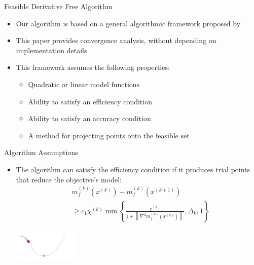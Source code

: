 \documentclass{beamer}
\newcommand{\xk}{{{x}^{(k)}}}
\begin{document}
\begin{frame}{Feasible Derivative Free Algorithm}
	\begin{itemize}
		\item Our algorithm is based on a general algorithmic framework proposed by \cite{CONEJO2013324}
		\item This paper provides convergence analysis, without depending on implementation details
		\item This framework assumes the following properties:
			\begin{itemize}
				\item Quadratic or linear model functions
				\item Ability to satisfy an efficiency condition
				\item Ability to satisfy an accuracy condition
				\item A method for projecting points onto the feasible set
			\end{itemize}
	\end{itemize}
\end{frame}




\begin{frame}{Algorithm Assumptions}
	\begin{itemize}
		\item The algorithm can satisfy the efficiency condition if it produces trial points that reduce the objective's model:
		\begin{align*}
			& m_f^{(k)}\left(\xk\right) - m_f^{(k)}\left(x^{(k+1)}\right) \\
			& \ge c_1 \chi^{(k)} \min \left\{
				\frac{\chi^{(k)}}{1 + \left\|\nabla^2 m_f^{(k)}\left(x^{(k)}\right)\right\|},
				\Delta_k, 1\right\}
		\end{align*}

		\begin{center}
			\includegraphics[width=120px]{images/sufficient_reduction.png}
		\end{center}
	\end{itemize}
\end{frame}
\end{document}
